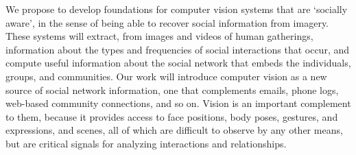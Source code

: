 

We propose to develop foundations for computer vision systems that are `socially aware', in the sense of being able to recover social information from imagery. These systems will extract, from images and videos of human gatherings,  information about the types and frequencies of social interactions that occur, and compute useful information about the social network that embeds the individuals, groups, and communities.  Our work will introduce computer vision as a new source of social network information, one that complements emails, phone logs, web-based community connections, and so on. Vision is an important complement to them, because it provides access to face positions, body poses, gestures, and expressions, and scenes, all of which are difficult to observe by any other means, but are critical signals for analyzing interactions and relationships. 



